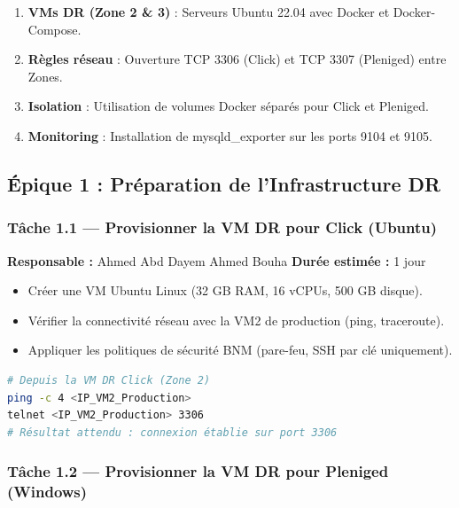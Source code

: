 \documentclass[a4paper,11pt]{article}
\newenvironment{infobox}[1][Information]{%
  \begin{tcolorbox}[colback=zoneblue, colframe=bnmlightblue, fonttitle=\bfseries, title=#1]
}{%
  \end{tcolorbox}
}
\begin{document}
\begin{infobox}[Prérequis Infrastructure]
\begin{enumerate}[noitemsep]
  \item \textbf{VMs DR (Zone 2 \& 3)} : Serveurs Ubuntu 22.04 avec Docker et Docker-Compose.
  \item \textbf{Règles réseau} : Ouverture TCP 3306 (Click) et TCP 3307 (Pleniged) entre Zones.
  \item \textbf{Isolation} : Utilisation de volumes Docker séparés pour Click et Pleniged.
  \item \textbf{Monitoring} : Installation de mysqld\_exporter sur les ports 9104 et 9105.
\end{enumerate}
\end{infobox}

\subsection{Épique 1 : Préparation de l'Infrastructure DR}

\subsubsection{Tâche 1.1 — Provisionner la VM DR pour Click (Ubuntu)}

\textbf{Responsable :} Ahmed Abd Dayem Ahmed Bouha \quad \textbf{Durée estimée :} 1 jour

\begin{itemize}[noitemsep]
  \item Créer une VM Ubuntu Linux (32 GB RAM, 16 vCPUs, 500 GB disque).
  \item Vérifier la connectivité réseau avec la VM2 de production (ping, traceroute).
  \item Appliquer les politiques de sécurité BNM (pare-feu, SSH par clé uniquement).
\end{itemize}

\begin{lstlisting}[language=bash, caption={Vérification connectivité depuis VM DR vers VM2 production}]
# Depuis la VM DR Click (Zone 2)
ping -c 4 <IP_VM2_Production>
telnet <IP_VM2_Production> 3306
# Résultat attendu : connexion établie sur port 3306
\end{lstlisting}

\subsubsection{Tâche 1.2 — Provisionner la VM DR pour Pleniged (Windows)}
\end{document}
